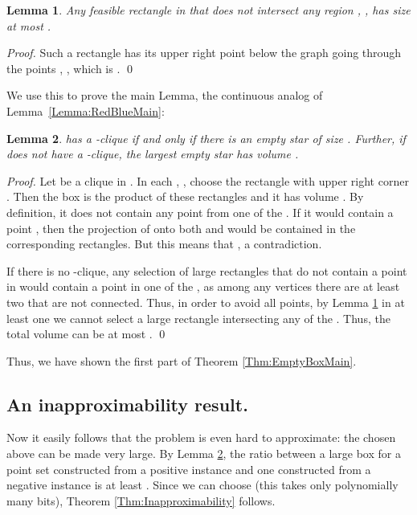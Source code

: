\documentclass[12pt]{article}
\newtheorem{lemma}{Lemma}
\begin{document}
\begin{lemma}\label{Lemma:RegionLemma} Any feasible rectangle in  that does not intersect any region , , has size at most .
\end{lemma}
\begin{proof} Such a rectangle has its upper right point below the graph going through the points , , which is . \qed
\end{proof}
We use this to prove the main Lemma, the continuous analog of Lemma~\ref{Lemma:RedBlueMain}:
\begin{lemma}\label{Lemma:MaxEmptyStar}  has a -clique if and only if there is an empty
  star of size . Further, if  does not have a -clique, the largest empty star has volume .
\end{lemma}
\begin{proof} Let  be a clique in . In each , , choose the rectangle with upper right corner . Then the box is the product of these
  rectangles and it has volume . By definition, it does not contain
  any point from one of the . If it would contain a point
  , then the projection of  onto both
   and  would be contained in the corresponding
  rectangles. But this means that , a contradiction.

  If there is no -clique, any selection of  large rectangles that do
  not contain a point in  would contain a point in one of the
  , as among any  vertices there are at least two that are not connected. Thus, in order to avoid all points, by Lemma
  \ref{Lemma:RegionLemma} in at least one  we cannot select a large
  rectangle intersecting any of the . Thus, the total volume can be
  at most .  \qed
\end{proof}
Thus, we have shown the first part of Theorem \ref{Thm:EmptyBoxMain}.

\subsection{An inapproximability result.}
Now it easily follows that the problem is even hard to approximate:
the  chosen above can be made very large. By Lemma
\ref{Lemma:MaxEmptyStar}, the ratio between a large box for a point set
constructed from a positive instance and one constructed from a negative
instance is at least . Since we can choose 
(this takes only polynomially many bits), Theorem \ref{Thm:Inapproximability} follows.
\end{document}
